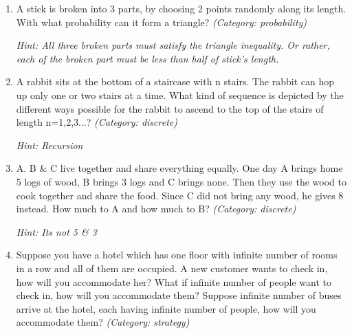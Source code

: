 \begin{enumerate}




\item A stick is broken into 3 parts, by choosing 2 points randomly along its length. With what probability can it form a triangle?
\small\emph{(Category: probability)}

\small\emph{Hint: All three broken parts must satisfy the triangle inequality. Or rather, each of the broken part must be less than half of stick's length.}





\item A rabbit sits at the bottom of a staircase with n stairs. The rabbit can hop up only one or two stairs at a time. What kind of sequence is depicted by the different ways possible for the rabbit to ascend to the top of the stairs of length n=1,2,3...?
\small\emph{(Category: discrete)}

\small\emph{Hint: Recursion}





\item A. B \& C live together and share everything equally. One day A brings home 5 logs of wood, B brings 3 logs and C brings none. Then they use the wood to cook together and share the food. Since C did not bring any wood, he gives $8$ instead. How much to A and how much to B?
\small\emph{(Category: discrete)}

\small\emph{Hint: Its not 5 \& 3}





\item Suppose you have a hotel which has one floor with infinite number of rooms in a row and all of them are occupied.
A new customer wants to check in, how will you accommodate her?
What if infinite number of people want to check in, how will you accommodate them?
Suppose infinite number of buses arrive at the hotel, each having infinite number of people, how will you accommodate them?
\small\emph{(Category: strategy)}


\end{enumerate}

